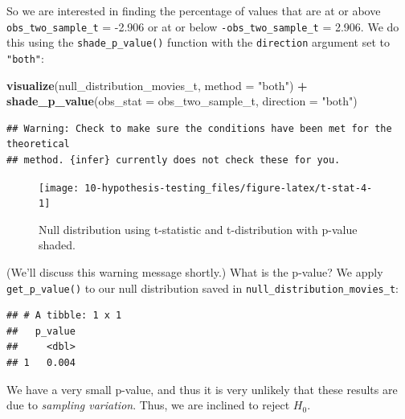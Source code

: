\documentclass[
]{book}
\newenvironment{Shaded}{\begin{snugshade}}{\end{snugshade}}
\newcommand{\DataTypeTok}[1]{\textcolor[rgb]{0.13,0.29,0.53}{#1}}
\newcommand{\KeywordTok}[1]{\textcolor[rgb]{0.13,0.29,0.53}{\textbf{#1}}}
\newcommand{\NormalTok}[1]{#1}
\newcommand{\OperatorTok}[1]{\textcolor[rgb]{0.81,0.36,0.00}{\textbf{#1}}}
\newcommand{\StringTok}[1]{\textcolor[rgb]{0.31,0.60,0.02}{#1}}
\begin{document}
So we are interested in finding the percentage of values that are at or above \texttt{obs\_two\_sample\_t} = -2.906 or at or below \texttt{-obs\_two\_sample\_t} = 2.906. We do this using the \texttt{shade\_p\_value()} function with the \texttt{direction} argument set to \texttt{"both"}:

\begin{Shaded}
\begin{Highlighting}[]
\KeywordTok{visualize}\NormalTok{(null_distribution_movies_t, }\DataTypeTok{method =} \StringTok{"both"}\NormalTok{) }\OperatorTok{+}
\StringTok{  }\KeywordTok{shade_p_value}\NormalTok{(}\DataTypeTok{obs_stat =}\NormalTok{ obs_two_sample_t, }\DataTypeTok{direction =} \StringTok{"both"}\NormalTok{)}
\end{Highlighting}
\end{Shaded}

\begin{verbatim}
## Warning: Check to make sure the conditions have been met for the theoretical
## method. {infer} currently does not check these for you.
\end{verbatim}

\begin{figure}

{\centering \texttt{[image: 10-hypothesis-testing\_files/figure-latex/t-stat-4-1]} 

}

\caption{Null distribution using t-statistic and t-distribution with p-value shaded.}\label{fig:t-stat-4}
\end{figure}

(We'll discuss this warning message shortly.) What is the p-value? We apply \texttt{get\_p\_value()} to our null distribution saved in \texttt{null\_distribution\_movies\_t}:

\begin{Shaded}
\end{Shaded}

\begin{verbatim}
## # A tibble: 1 x 1
##   p_value
##     <dbl>
## 1   0.004
\end{verbatim}

We have a very small p-value, and thus it is very unlikely that these results are due to \emph{sampling variation}. Thus, we are inclined to reject \(H_0\).
\end{document}
